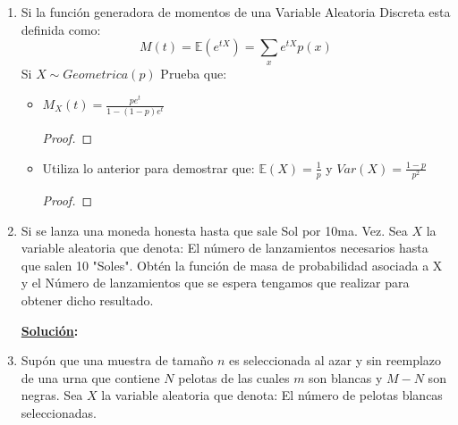 \documentclass[11pt,letterpaper]{report}
\newcommand{\sol}{\textbf{\underline{Solución}: }} %
\begin{document}
\begin{enumerate}
\begin{itemize}
    \item Explica por que $X$ no tiene una distribución geométrica
    
    \sol

    \item Demuestra que la $p_X(i)$ esta dada por:
    $p_X(i)= \frac{binom{r+b-i}{r-1}}{\binom{r+b}{r}}$ si $i=1,2,\ldots,b+1$

    \begin{proof}
        
    \end{proof}
\end{itemize}

\item Si la función generadora de momentos de una Variable Aleatoria Discreta esta definida como:
\[
    M(t) = \mathds{E}(e^{tX}) = \sum_{x} e^{tX} p(x)
\]
Si $X \sim Geometrica(p)$ Prueba que:
\begin{itemize}
    \item $M_X(t) = \frac{pe^t}{1-(1-p)e^t}$
    
    \begin{proof}
        
    \end{proof}

    \item Utiliza lo anterior para demostrar que: $\mathds{E}(X) = \frac{1}{p}$ y $Var(X) = \frac{1 - p}{p^2}$
    
    \begin{proof}
        
    \end{proof}
\end{itemize}

\item Si se lanza una moneda honesta hasta que sale Sol por 10ma. Vez. Sea $X$ la variable aleatoria que denota: El
número de lanzamientos necesarios hasta que salen 10 "Soles". Obtén la función de masa de probabilidad asociada a X y
el Número de lanzamientos que se espera tengamos que realizar para obtener dicho resultado.

\sol

\item Supón que una muestra de tamaño $n$ es seleccionada al azar y sin reemplazo de una urna que contiene $N$ pelotas de
las cuales $m$ son blancas y $M-N$ son negras. Sea $X$ la variable aleatoria que denota: El número de pelotas
blancas seleccionadas.


\end{enumerate}
\end{document}
